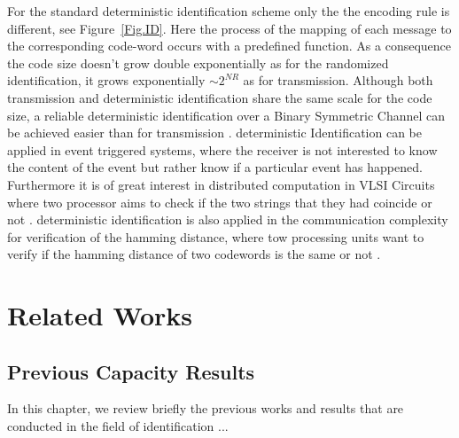 For the standard deterministic identification scheme only the the encoding rule is different, see Figure~\ref{Fig.ID}. Here the process of the mapping of each message to the corresponding code-word occurs with a predefined function. As a consequence the code size doesn't grow double exponentially as for the randomized identification, it grows exponentially $\sim 2^{N R}$ as for transmission. Although both transmission and deterministic identification share the same scale for the code size, a reliable deterministic identification over a Binary Symmetric Channel can be achieved easier than for transmission \cite{J85}. deterministic Identification can be applied in event triggered systems, where the receiver is not interested to know the content of the event but rather know if a particular event has happened. Furthermore it is of great interest in distributed computation in VLSI Circuits where two processor aims to check if the two strings that they had coincide or not \cite{ja1984}. deterministic identification is also applied in the communication complexity for verification of the hamming distance, where tow processing units want to verify if the hamming distance of two codewords is the same or not \cite{paturi186}.

\chapter{Related Works}
\section{Previous Capacity Results}
\label{chap:Related_Works}
In this chapter, we review briefly the previous works and results that are conducted in the field of identification ...

